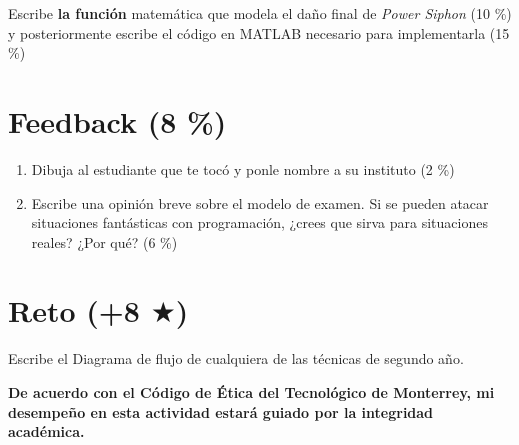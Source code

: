 \documentclass[11pt]{article}
\begin{document}
\bigskip

Escribe \textbf{la función} matemática que modela el daño final de \textit{Power Siphon} (10 \%) y posteriormente escribe el código en MATLAB necesario para implementarla (15 \%)

\section{Feedback (8 \%)}

\begin{enumerate}[label=\alph*)]
    \item Dibuja al estudiante que te tocó y ponle nombre a su instituto (2 \%)
    \item Escribe una opinión breve sobre el modelo de examen. Si se pueden atacar situaciones fantásticas con programación, ¿crees que sirva para situaciones reales? ¿Por qué? (6 \%)
\end{enumerate}

\section{Reto (+8 $\bigstar$)}

Escribe el Diagrama de flujo de cualquiera de las técnicas de segundo año.

\vfill

\textbf{De acuerdo con el Código de Ética del Tecnológico de Monterrey, mi desempeño en esta actividad estará guiado por la integridad académica.}
\end{document}
